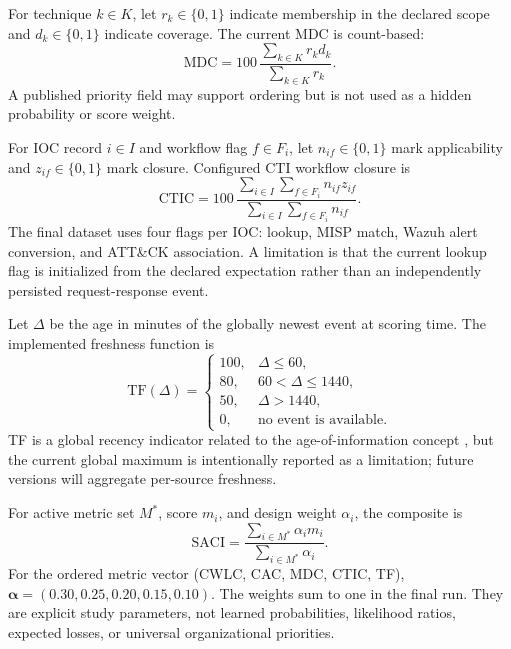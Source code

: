 \documentclass[a4paper,conference]{IEEEtran}
\begin{document}
For technique $k\in K$, let $r_k\in\{0,1\}$ indicate membership in the declared scope and $d_k\in\{0,1\}$ indicate coverage. The current MDC is count-based:
\begin{equation}
\mathrm{MDC}=100\,
\frac{\sum_{k\in K}r_kd_k}{\sum_{k\in K}r_k}.
\label{eq:mdc}
\end{equation}
A published priority field may support ordering but is not used as a hidden probability or score weight.

For IOC record $i\in I$ and workflow flag $f\in F_i$, let $n_{if}\in\{0,1\}$ mark applicability and $z_{if}\in\{0,1\}$ mark closure. Configured CTI workflow closure is
\begin{equation}
\mathrm{CTIC}=100\,
\frac{\sum_{i\in I}\sum_{f\in F_i}n_{if}z_{if}}
{\sum_{i\in I}\sum_{f\in F_i}n_{if}}.
\label{eq:ctic}
\end{equation}
The final dataset uses four flags per IOC: lookup, MISP match, Wazuh alert conversion, and ATT\&CK association. A limitation is that the current lookup flag is initialized from the declared expectation rather than an independently persisted request-response event.

Let $\Delta$ be the age in minutes of the globally newest event at scoring time. The implemented freshness function is
\begin{equation}
\mathrm{TF}(\Delta)=
\begin{cases}
100, & \Delta\leq 60,\\
80, & 60<\Delta\leq 1440,\\
50, & \Delta>1440,\\
0, & \text{no event is available}.
\end{cases}
\label{eq:tf}
\end{equation}
TF is a global recency indicator related to the age-of-information concept \cite{kaul2012}, but the current global maximum is intentionally reported as a limitation; future versions will aggregate per-source freshness.

For active metric set $M^*$, score $m_i$, and design weight $\alpha_i$, the composite is
\begin{equation}
\mathrm{SACI}=\frac{\sum_{i\in M^*}\alpha_i m_i}
{\sum_{i\in M^*}\alpha_i}.
\label{eq:saci}
\end{equation}
For the ordered metric vector (CWLC, CAC, MDC, CTIC, TF),
$\boldsymbol{\alpha}=(0.30,0.25,0.20,0.15,0.10)$.
The weights sum to one in the final run. They are explicit study parameters, not learned probabilities, likelihood ratios, expected losses, or universal organizational priorities.
\end{document}

